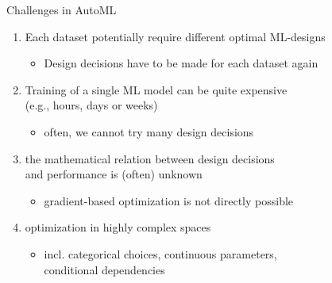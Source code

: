 \begin{frame}[c]{Challenges in AutoML}

\begin{enumerate}
  \item Each dataset potentially require \alert{different optimal ML-designs}
  \begin{itemize}
    \item Design decisions have to be made for each dataset again
  \end{itemize}
  \smallskip
  \pause
  \item Training of a single ML model can be quite \alert{expensive}\\
  		(e.g., hours, days or weeks)
  \begin{itemize}
    \item often, we cannot try many design decisions
  \end{itemize}
  \smallskip
  \pause
  \item the \alert{mathematical relation} between design decisions\\ and performance is (often) \alert{unknown}
  \begin{itemize}
    \item gradient-based optimization is not directly possible
  \end{itemize}
  \smallskip
  \pause
  \item optimization in \alert{highly complex spaces}
  \begin{itemize}
    \item incl. categorical choices, continuous parameters,\\ conditional dependencies
  \end{itemize}
  
\end{enumerate}

\end{frame}



